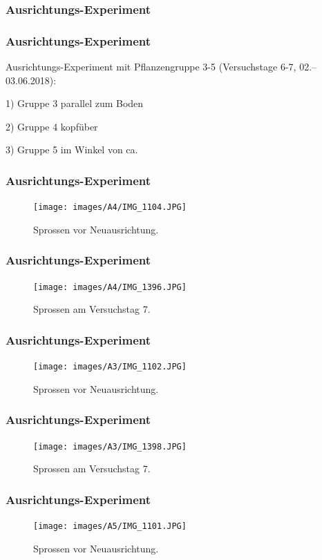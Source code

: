 \documentclass[aspectratio=169]{beamer}
\begin{document}
	\subsubsection{Ausrichtungs-Experiment}
	
	\begin{frame}
		\frametitle{Ausrichtungs-Experiment}
	Ausrichtungs-Experiment mit Pflanzengruppe 3-5 (Versuchstage 6-7, 02.–03.06.2018):
	
	1) Gruppe 3 parallel zum Boden
	
	2) Gruppe 4 kopfüber
	
	3) Gruppe 5 im Winkel von ca. %
	
\end{frame}
	

\begin{frame}
\frametitle{Ausrichtungs-Experiment}
\begin{figure}[H]
\centering
\texttt{[image: images/A4/IMG\_1104.JPG]}
\caption{Sprossen vor Neuausrichtung.\label{A41}}	
\end{figure}
\end{frame}

\begin{frame}
\frametitle{Ausrichtungs-Experiment}
\begin{figure}[H]
\centering
\texttt{[image: images/A4/IMG\_1396.JPG]}
\caption{Sprossen am Versuchstag 7.\label{A47}}
\end{figure}
\end{frame}	
	
\begin{frame}
\frametitle{Ausrichtungs-Experiment}
\begin{figure}[H]
\centering
\texttt{[image: images/A3/IMG\_1102.JPG]}
\caption{Sprossen vor Neuausrichtung.\label{A31}}	
\end{figure}
\end{frame}

\begin{frame}
\frametitle{Ausrichtungs-Experiment}
\begin{figure}[H]
\texttt{[image: images/A3/IMG\_1398.JPG]}
\caption{Sprossen am Versuchstag 7.\label{A37}}
\end{figure}
\end{frame}

\begin{frame}
\frametitle{Ausrichtungs-Experiment}
\begin{figure}[H]
\centering
\texttt{[image: images/A5/IMG\_1101.JPG]}
\caption{Sprossen vor Neuausrichtung.\label{A51}}		
\end{figure}
\end{frame}
\end{document}
